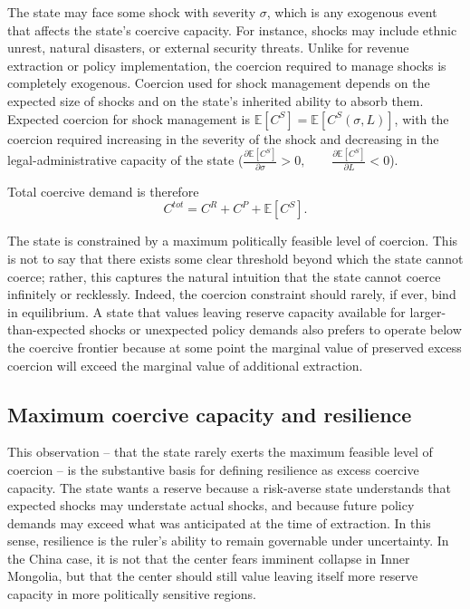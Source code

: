 \documentclass[12pt]{article}
\newcommand{\E}{\mathbb{E}}
\begin{document}
The state may face some shock with severity $\sigma$, which is any exogenous event that affects the state's coercive capacity. For instance, shocks may include ethnic unrest, natural disasters, or external security threats. Unlike for revenue extraction or policy implementation, the coercion required to manage shocks is completely exogenous. Coercion used for shock management depends on the expected size of shocks and on the state's inherited ability to absorb them. Expected coercion for shock management is $\E[C^S] = \E[C^S(\sigma,L)]$, with the coercion required increasing in the severity of the shock and decreasing in the legal-administrative capacity of the state ($\frac{\partial \E[C^S]}{\partial \sigma} > 0, \qquad \frac{\partial \E[C^S]}{\partial L} < 0$).

Total coercive demand is therefore
\begin{equation}
C^{tot} = C^R + C^P + \E[C^S].
\end{equation}

The state is constrained by a maximum politically feasible level of coercion. This is not to say that there exists some clear threshold beyond which the state cannot coerce; rather, this captures the natural intuition that the state cannot coerce infinitely or recklessly. Indeed, the coercion constraint should rarely, if ever, bind in equilibrium. A state that values leaving reserve capacity available for larger-than-expected shocks or unexpected policy demands also prefers to operate below the coercive frontier because at some point the marginal value of preserved excess coercion will exceed the marginal value of additional extraction.

\subsection{Maximum coercive capacity and resilience}

This observation -- that the state rarely exerts the maximum feasible level of coercion -- is the substantive basis for defining resilience as excess coercive capacity. The state wants a reserve because a risk-averse state understands that expected shocks may understate actual shocks, and because future policy demands may exceed what was anticipated at the time of extraction. In this sense, resilience is the ruler's ability to remain governable under uncertainty. In the China case, it is not that the center fears imminent collapse in Inner Mongolia, but that the center should still value leaving itself more reserve capacity in more politically sensitive regions.
\end{document}
